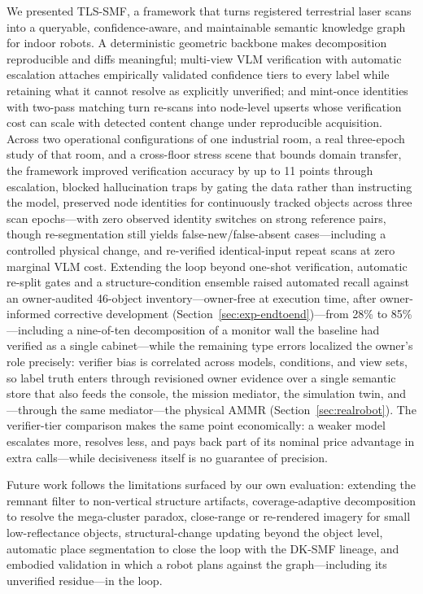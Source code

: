 \documentclass[electronics,article,accept,pdftex,moreauthors]{Definitions/mdpi}
\begin{document}
We presented TLS-SMF, a framework that turns registered terrestrial laser scans into
a queryable, confidence-aware, and maintainable semantic knowledge graph for
indoor robots. A deterministic geometric backbone makes decomposition
reproducible and diffs meaningful; multi-view VLM verification with automatic
escalation attaches empirically validated confidence tiers to every label
while retaining what it
cannot resolve as explicitly unverified; and mint-once identities with
two-pass matching turn re-scans into node-level upserts whose
verification cost can scale with detected content change under
reproducible acquisition. Across two operational configurations of one
industrial room, a real three-epoch study of that room, and a
cross-floor stress scene that bounds domain transfer, the framework improved verification accuracy by up to 11
points through escalation, blocked hallucination traps by gating the data
rather than instructing the model, preserved node identities for
continuously tracked objects across three scan epochs---with zero
observed identity switches on strong reference pairs, though
re-segmentation still yields false-new/false-absent cases---including a
controlled physical change, and re-verified identical-input repeat scans
at zero marginal VLM cost. Extending the loop beyond one-shot
verification, automatic re-split gates and a structure-condition ensemble
raised automated recall against an owner-audited 46-object
inventory---owner-free at execution time, after owner-informed corrective
development (Section~\ref{sec:exp-endtoend})---from 28\% to 85\%---including a nine-of-ten decomposition of a monitor
wall the baseline had verified as a single cabinet---while the remaining
type errors localized the owner's role precisely: verifier bias is
correlated across models, conditions, and view sets, so label truth enters
through revisioned owner evidence over a single semantic store that also
feeds the console, the mission mediator, the simulation twin, and---through
the same mediator---the physical AMMR (Section~\ref{sec:realrobot}). The
verifier-tier comparison makes the same point economically: a weaker model
escalates more, resolves less, and pays back part of its nominal price
advantage in extra calls---while decisiveness itself is no guarantee of
precision.

Future work follows the limitations surfaced by our own evaluation:
extending the remnant filter to non-vertical structure artifacts,
coverage-adaptive decomposition to resolve the mega-cluster paradox,
close-range or re-rendered imagery for small low-reflectance objects,
structural-change updating beyond the object level, automatic place
segmentation to close the loop with the DK-SMF lineage, and embodied
validation in which a robot plans against the graph---including its
unverified residue---in the loop.
\end{document}
